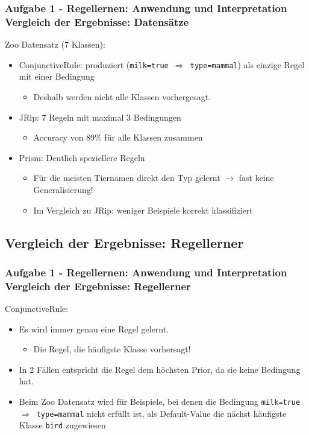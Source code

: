 \documentclass[accentcolor=tud6b,colorbacktitle,inverttitle,landscape,german,presentation,t]{tudbeamer}
\begin{document}
    \begin{frame}[t]
    \frametitle{Aufgabe 1 - Regellernen: Anwendung und Interpretation\\ Vergleich der Ergebnisse: Datensätze}
        Zoo Datensatz (7 Klassen):
        \begin{itemize}
            \item ConjunctiveRule: produziert (\texttt{milk=true $\Rightarrow$ type=mammal}) als einzige Regel mit einer Bedingung
            \begin{itemize}
                \item Deshalb werden nicht alle Klassen vorhergesagt.
            \end{itemize}
            \item JRip: 7 Regeln mit maximal 3 Bedingungen
             \begin{itemize}
                \item  Accuracy von 89\% für alle Klassen zusammen
            \end{itemize}
            \item Prism: Deutlich speziellere Regeln 
            \begin{itemize}
               \item Für die meisten Tiernamen direkt den Typ gelernt $\rightarrow$ fast keine Generalisierung!
                \item Im Vergleich zu JRip: weniger Beispiele korrekt klassifiziert
            \end{itemize}
        \end{itemize}
    \end{frame}    
   
    
    \subsection{Vergleich der Ergebnisse: Regellerner}
    
    \begin{frame}[t]
    \frametitle{Aufgabe 1 - Regellernen: Anwendung und Interpretation\\ Vergleich der Ergebnisse: Regellerner}
        ConjunctiveRule:
        \begin{itemize}
            \item Es wird immer genau eine Regel gelernt.
            \begin{itemize}
                \item  Die Regel, die häufigste Klasse vorhersagt!
            \end{itemize}
            \item In 2 Fällen entspricht die Regel dem höchsten Prior, da sie keine Bedingung hat.
            \item Beim Zoo Datensatz wird für Beispiele, bei denen die Bedingung \texttt{milk=true $\Rightarrow$ type=mammal} nicht erfüllt ist,
                  als Default-Value die nächst häufigste Klasse \texttt{bird} zugewiesen
        \end{itemize}
    \end{frame}
    
\end{document}
